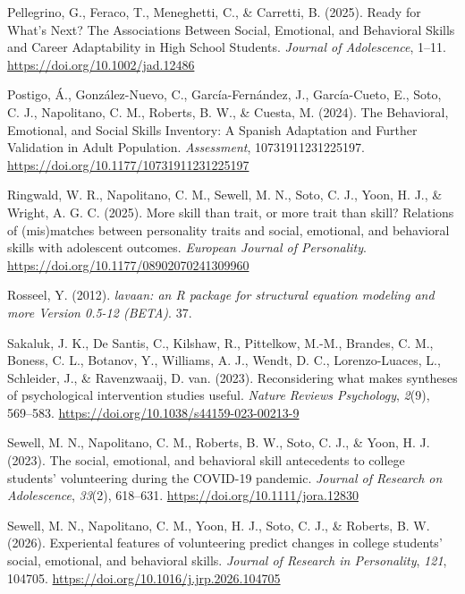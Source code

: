 \documentclass[
  man,
  longtable,
  nolmodern,
  notxfonts,
  notimes,
  colorlinks=true,linkcolor=blue,citecolor=blue,urlcolor=blue]{apa7}
\newlength{\cslhangindent}
\newenvironment{CSLReferences}[2] %
 {\begin{list}{}{%
  \setlength{\itemindent}{0pt}
  \setlength{\leftmargin}{0pt}
  \setlength{\parsep}{0pt}
  \ifodd #1
   \setlength{\leftmargin}{\cslhangindent}
   \setlength{\itemindent}{-1\cslhangindent}
  \fi
  \setlength{\itemsep}{#2\baselineskip}}}
 {\end{list}}
\begin{document}
\begin{CSLReferences}{1}{0}
Pellegrino, G., Feraco, T., Meneghetti, C., \& Carretti, B. (2025).
Ready for What's Next? The Associations Between Social, Emotional, and
Behavioral Skills and Career Adaptability in High School Students.
\emph{Journal of Adolescence}, 1--11.
\url{https://doi.org/10.1002/jad.12486}

Postigo, Á., González-Nuevo, C., García-Fernández, J., García-Cueto, E.,
Soto, C. J., Napolitano, C. M., Roberts, B. W., \& Cuesta, M. (2024).
The Behavioral, Emotional, and Social Skills Inventory: A Spanish
Adaptation and Further Validation in Adult Population.
\emph{Assessment}, 10731911231225197.
\url{https://doi.org/10.1177/10731911231225197}

Ringwald, W. R., Napolitano, C. M., Sewell, M. N., Soto, C. J., Yoon, H.
J., \& Wright, A. G. C. (2025). More skill than trait, or more trait
than skill? Relations of (mis)matches between personality traits and
social, emotional, and behavioral skills with adolescent outcomes.
\emph{European Journal of Personality}.
\url{https://doi.org/10.1177/08902070241309960}

Rosseel, Y. (2012). \emph{lavaan: an R package for structural equation
modeling and more Version 0.5-12 (BETA)}. 37.

Sakaluk, J. K., De Santis, C., Kilshaw, R., Pittelkow, M.-M., Brandes,
C. M., Boness, C. L., Botanov, Y., Williams, A. J., Wendt, D. C.,
Lorenzo-Luaces, L., Schleider, J., \& Ravenzwaaij, D. van. (2023).
Reconsidering what makes syntheses of psychological intervention studies
useful. \emph{Nature Reviews Psychology}, \emph{2}(9), 569--583.
\url{https://doi.org/10.1038/s44159-023-00213-9}

Sewell, M. N., Napolitano, C. M., Roberts, B. W., Soto, C. J., \& Yoon,
H. J. (2023). The social, emotional, and behavioral skill antecedents to
college students' volunteering during the COVID-19 pandemic.
\emph{Journal of Research on Adolescence}, \emph{33}(2), 618--631.
\url{https://doi.org/10.1111/jora.12830}

Sewell, M. N., Napolitano, C. M., Yoon, H. J., Soto, C. J., \& Roberts,
B. W. (2026). Experiental features of volunteering predict changes in
college students{'} social, emotional, and behavioral skills.
\emph{Journal of Research in Personality}, \emph{121}, 104705.
\url{https://doi.org/10.1016/j.jrp.2026.104705}


\end{CSLReferences}
\end{document}
